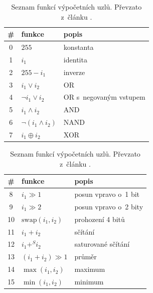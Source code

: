 \begin{table}[htb]
    \caption{Seznam funkcí výpočetních uzlů. Převzato z~článku \cite{SikuPPSN}.}
    \renewcommand{\arraystretch}{1.2}
    \begin{minipage}[t]{.5\textwidth}
        \small\centering\begin{tabular}{cll}
            \toprule
            \# & funkce & popis \\
            \midrule
            0 & $255$ & konstanta \\
            1 & $i_1$ & identita \\
            2 & $255 - i_1$ & inverze \\
            3 & $i_1 \vee i_2$ & OR \\
            4 & $\neg i_1 \vee i_2$ & OR s~negovaným vstupem \\
            5 & $i_1 \wedge i_2$ & AND \\
            6 & $\neg (i_1 \wedge i_2)$ & NAND \\
            7 & $i_1 \oplus i_2$ & XOR \\
            \bottomrule
        \end{tabular}

    \end{minipage}
    \begin{minipage}[t]{.5\textwidth}
        \small\centering\begin{tabular}{cll}
            \toprule
            \# & funkce & popis \\
            \midrule
            8 & $i_1 \gg 1$ & posun vpravo o~1 bit \\
            9 & $i_1 \gg 2$ & posun vpravo o~2 bity \\
            10 & $\mathrm{swap}(i_1, i_2)$ & prohození 4 bitů \\
            11 & $i_1 + i_2$ & sčítání \\
            12 & $i_1 +^S i_2$ & saturované sčítání \\
            13 & $(i_1 + i_2) \gg 1$ & průměr \\
            14 & $\max(i_1, i_2)$ & maximum \\
            15 & $\min(i_1, i_2)$ & minimum \\
            \bottomrule
        \end{tabular}

    \end{minipage}
    \label{tabCGPFunctions}
\end{table}

